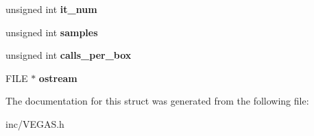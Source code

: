 \begin{DoxyCompactItemize}
\item 
\hypertarget{structgsl__monte__vegas__state_ad032def326052e0352ff33203698ae97}{unsigned int {\bfseries it\-\_\-num}}\label{structgsl__monte__vegas__state_ad032def326052e0352ff33203698ae97}

\item 
\hypertarget{structgsl__monte__vegas__state_acb983f788ccdb5cd444790b23e29b1f3}{unsigned int {\bfseries samples}}\label{structgsl__monte__vegas__state_acb983f788ccdb5cd444790b23e29b1f3}

\item 
\hypertarget{structgsl__monte__vegas__state_a1ad73e6614942d0ba3a86eb5ea718b61}{unsigned int {\bfseries calls\-\_\-per\-\_\-box}}\label{structgsl__monte__vegas__state_a1ad73e6614942d0ba3a86eb5ea718b61}

\item 
\hypertarget{structgsl__monte__vegas__state_a1aa5cda0e2b42f0082b2914ad8f24439}{F\-I\-L\-E $\ast$ {\bfseries ostream}}\label{structgsl__monte__vegas__state_a1aa5cda0e2b42f0082b2914ad8f24439}

\end{DoxyCompactItemize}


The documentation for this struct was generated from the following file\-:\begin{DoxyCompactItemize}
\item 
inc/V\-E\-G\-A\-S.\-h\end{DoxyCompactItemize}
